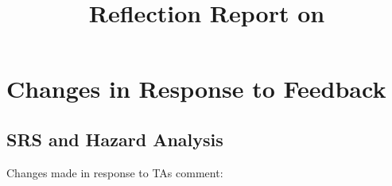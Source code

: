 \documentclass{article}
\title{Reflection Report on \progname}
\author{\authname}
\date{}
\begin{document}
	
	\maketitle
	
	
	\section{Changes in Response to Feedback}
	
	
	
	\subsection{SRS and Hazard Analysis}
	
	Changes made in response to TAs comment:
	
\end{document}
